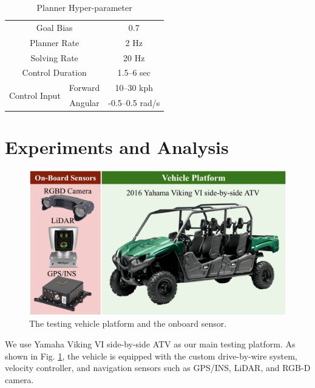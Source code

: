 \documentclass[../thesis.tex]{subfiles}
\begin{document}
\begin{table}[t]
    	\centering
    	\caption{Planner Hyper-parameter}
    	\label{table:rrt-parameters}
    	\begin{small}
    	\begin{sc}
    	\begin{tabular}{ccc}
           	\midrule \midrule
           	\multicolumn{2}{c}{Goal Bias} & 0.7 \\
           	\multicolumn{2}{c}{Planner Rate} & 2 Hz \\
           	\multicolumn{2}{c}{Solving Rate} & 20 Hz \\
           	\multicolumn{2}{c}{Control Duration} & 1.5--6 sec \\
           	\multirow{2}{*}{Control Input} & Forward & 10--30 kph \\
           	                                                       	& Angular & -0.5--0.5 rad/s \\
           	\toprule
    	\end{tabular}
    	\end{sc}
    	\end{small}
\end{table}
 
 
\section{Experiments and Analysis} \label{sec:rrt-experiments}
 
 
\begin{figure}[t]
    	\begin{center}
    	 \centerline{\includegraphics[width=0.7\columnwidth]{./RRTPlanner/fig/viking.png}}
           	\caption{The testing vehicle platform and the onboard sensor.}
           	\label{fig:viking}
    	\end{center}
\end{figure}
 
We use Yamaha Viking VI side-by-side ATV as our main testing platform. 
As shown in Fig. \ref{fig:viking}, the vehicle is equipped with the custom drive-by-wire system, velocity controller, and navigation sensors such as GPS/INS, LiDAR, and RGB-D camera.
 
\end{document}
